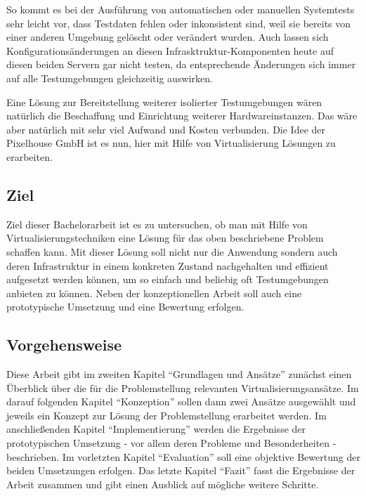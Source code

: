 So kommt es bei der Ausführung von automatischen oder manuellen Systemtests sehr leicht vor, dass Testdaten fehlen oder inkonsistent sind, weil sie bereits von einer anderen Umgebung gelöscht oder verändert wurden. Auch lassen sich Konfigurationsänderungen an diesen Infrasktruktur-Komponenten heute auf diesen beiden Servern gar nicht testen, da entsprechende Änderungen sich immer auf alle Testumgebungen gleichzeitig auswirken.

Eine Lösung zur Bereitstellung weiterer isolierter Testumgebungen wären natürlich die Beschaffung und Einrichtung weiterer Hardwareinstanzen. Das wäre aber natürlich mit sehr viel Aufwand und Kosten verbunden. Die Idee der Pixelhouse GmbH ist es nun, hier mit Hilfe von Virtualisierung Lösungen zu erarbeiten.

\subsection{Ziel}

Ziel dieser Bachelorarbeit ist es zu untersuchen, ob man mit Hilfe von Virtualisierungstechniken eine Lösung für das oben beschriebene Problem schaffen kann. Mit dieser Lösung soll nicht nur die Anwendung sondern auch deren Infrastruktur in einem konkreten Zustand nachgehalten und effizient aufgesetzt werden können, um so einfach und beliebig oft Testumgebungen anbieten zu können. Neben der konzeptionellen Arbeit soll auch eine prototypische Umsetzung und eine Bewertung erfolgen.

\subsection{Vorgehensweise}

Diese Arbeit gibt im zweiten Kapitel "`Grundlagen und Ansätze"' zunächst einen Überblick über die für die Problemstellung relevanten Virtualisierungsansätze. Im darauf folgenden Kapitel "`Konzeption"' sollen dann zwei Ansätze ausgewählt und jeweils ein Konzept zur Lösung der Problemstellung erarbeitet werden. Im anschließenden Kapitel "`Implementierung"' werden die Ergebnisse der prototypischen Umsetzung - vor allem deren Probleme und Besonderheiten - beschrieben. Im vorletzten Kapitel "`Evaluation"' soll eine objektive Bewertung der beiden Umsetzungen erfolgen. Das letzte Kapitel "`Fazit"' fasst die Ergebnisse der Arbeit zusammen und gibt einen Ausblick auf mögliche weitere Schritte.

